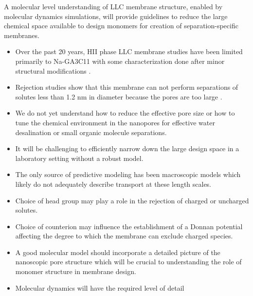 \documentclass{article}
\begin{document}
  A molecular level understanding of LLC membrane structure, enabled by molecular
  dynamics simulations, will provide guidelines to reduce the large chemical space
  available to design monomers for creation of separation-specific membranes.
  \begin{itemize}
    \item Over the past 20 years, HII phase LLC membrane studies have been limited primarily
    to Na-GA3C11 with some characterization done after minor structural modifications
    \cite{resel_structural_2000}.
    \item Rejection studies show that this membrane can not perform separations of
    solutes less than 1.2 nm in diameter because the pores are too large \cite{zhou_supported_2005}.
    \item  We do not yet understand how to reduce the effective pore size or 
    how to tune the chemical environment in the nanopores for effective water
    desalination or small organic molecule separations.
    \item It will be challenging to efficiently narrow down the large design space in 
    a laboratory setting without a robust model.
    \item The only source of predictive modeling has been macroscopic models 
    which likely do not adequately describe transport at these length scales. %
    \item Choice of head group may play a role in the rejection of charged or uncharged solutes.
    \item Choice of counterion may influence the establishment of a Donnan potential
    affecting the degree to which the membrane can exclude charged species.
    \item A good molecular model should incorporate a detailed picture of the nanoscopic pore 
    structure which will be crucial to understanding the role of monomer structure in 
    membrane design.
    \item Molecular dynamics will have the required level of detail
  \end{itemize}
  
\end{document}
